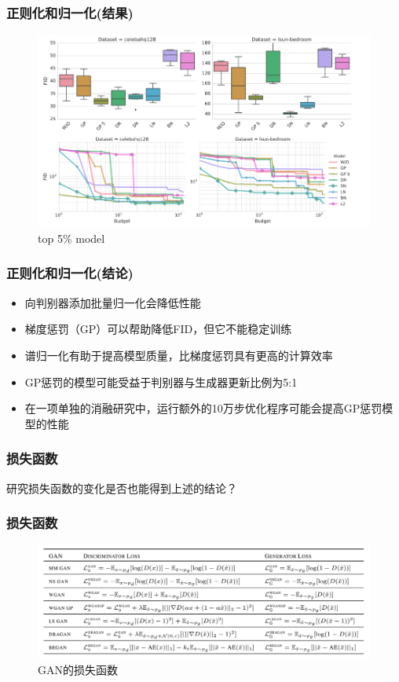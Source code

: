 \documentclass{beamer}
\begin{document}
\begin{frame}[c]\frametitle{正则化和归一化(结果)}
    \begin{figure}[ht]
        \centering
        \includegraphics[scale=0.5]{result1.png}  %
        \caption{top 5\% model}
    \end{figure}
\end{frame}

\begin{frame}[c]\frametitle{正则化和归一化(结论)}
    \begin{itemize}
        \item 向判别器添加批量归一化会降低性能
        \item 梯度惩罚（GP）可以帮助降低FID，但它不能稳定训练
        \item 谱归一化有助于提高模型质量，比梯度惩罚具有更高的计算效率
        \item GP惩罚的模型可能受益于判别器与生成器更新比例为5:1
        \item 在一项单独的消融研究中，运行额外的10万步优化程序可能会提高GP惩罚模型的性能
    \end{itemize}
\end{frame}

\begin{frame}[c]\frametitle{损失函数}
    研究损失函数的变化是否也能得到上述的结论？
\end{frame}

\begin{frame}[c]\frametitle{损失函数}
    \begin{figure}[top]
        \centering
        \includegraphics[scale=0.3]{loss.png}  %
        \caption{GAN的损失函数}
    \end{figure}
\end{frame}
\end{document}
